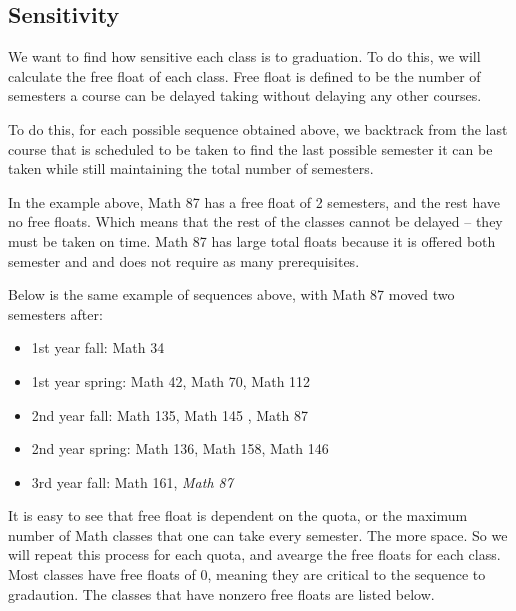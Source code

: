 \documentclass[12pt, oneside]{article}
\begin{document}
\subsection{Sensitivity}
We want to find how sensitive each class is to graduation. To do this, we will calculate the free float of each class. Free float is defined to be the number of semesters a course can be delayed taking without delaying any other courses. 

\bigskip


To do this, for each possible sequence obtained above, we backtrack from the last course that is scheduled to be taken to find the last possible semester it can be taken while still maintaining the total number of semesters. 

\bigskip


In the example above, Math 87 has a free float of 2 semesters, and the rest have no free floats. Which means that the rest of the classes cannot be delayed -- they must be taken on time. Math 87 has large total floats because it is offered both semester and and does not require as many prerequisites. 

\bigskip


Below is the same example of sequences above, with Math 87 moved two semesters after: 
\begin{itemize}
    \item 1st year fall: Math 34
    \item 1st year spring: Math 42, Math 70, Math 112
    \item 2nd year fall: Math 135, Math 145 \color{gray}, Math 87 \color{black}
    \item 2nd year spring: Math 136, Math 158, Math 146
    \item 3rd year fall: Math 161, \textit{Math 87}
    \end{itemize}



It is easy to see that free float is dependent on the quota, or the maximum number of Math classes that one can take every semester. The more space. So we will repeat this process for each quota, and avearge the free floats for each class. Most classes have free floats of 0, meaning they are critical to the sequence to gradaution. The classes that have nonzero free floats are listed below.

\bigskip
\end{document}
